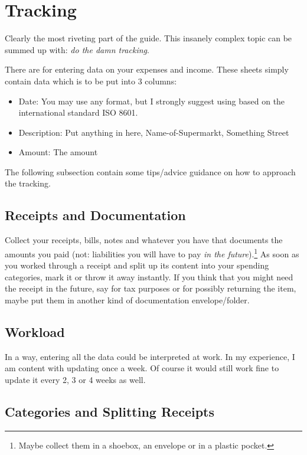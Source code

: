 \section{Tracking}
\label{sec:Tracking}

Clearly the most riveting part of the guide.
This insanely complex topic can be summed up with: \emph{do the damn tracking}.

There are  for entering data on your expenses and income.
These sheets simply contain data which is to be put into 3 columns:
\begin{itemize}
	\item Date: You may use any format, but I strongly suggest using  based on the international standard ISO 8601.
	\item Description: Put anything in here, \eg Name-of-Supermarkt, Something Street
	\item Amount: The amount
\end{itemize}

The following subsection contain some tips/advice guidance on how to approach the tracking. 

\subsection{Receipts and Documentation}
\label{subsec:receipts}

Collect your receipts, bills, notes and whatever you have that documents the amounts you paid (not: liabilities you will have to pay \emph{in the future}).\footnote{Maybe collect them in a shoebox, an envelope or in a plastic pocket.}
As soon as you worked through a receipt and split up its content into your spending categories, mark it or throw it away instantly.
If you think that you might need the receipt in the future, say for tax purposes or for possibly returning the item, maybe put them in another kind of documentation envelope/folder.

\subsection{Workload}
\label{subsec:workload}

In a way, entering all the data could be interpreted at work.
In my experience, I am content with updating \tfn once a week.
Of course it would still work fine to update it every 2, 3 or 4 weeks as well.

\subsection{Categories and Splitting Receipts}
\label{subsec:tracking-categories}

